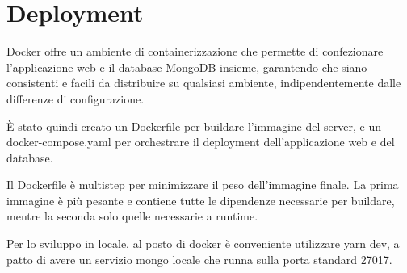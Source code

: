 \section*{Deployment}

Docker offre un ambiente di containerizzazione che permette di confezionare l'applicazione web e il database MongoDB insieme, garantendo che siano consistenti e facili da distribuire su qualsiasi ambiente, indipendentemente dalle differenze di configurazione.

È stato quindi creato un Dockerfile per buildare l'immagine del server, e un docker-compose.yaml per orchestrare il deployment dell'applicazione web e del database.

Il Dockerfile è multistep per minimizzare il peso dell'immagine finale. La prima immagine è più pesante e contiene tutte le dipendenze necessarie per buildare, mentre la seconda solo quelle necessarie a runtime.

Per lo sviluppo in locale, al posto di docker è conveniente utilizzare yarn dev, a patto di avere un servizio mongo locale che runna sulla porta standard 27017.

